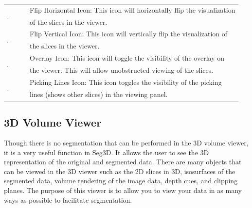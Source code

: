 \documentclass[fleqn,11pt,openany]{book}
\begin{document}
\begin{table}[h!]
\begin{tabular}{|l|l|}
& \\
\hline
\multirow{2}{*}{ \includegraphics[width=0.05\textwidth]{Seg3DBasicFunctionality_figures/FlipHorizOff.png} }
& Flip Horizontal Icon: This icon will horizontally flip the visualization \\
& of the slices in the viewer.\\
\hline
\multirow{2}{*}{ \includegraphics[width=0.05\textwidth]{Seg3DBasicFunctionality_figures/FlipVertOff.png} }
& Flip Vertical Icon: This icon will vertically flip the visualization of \\
& the slices in the viewer.\\
\hline
\multirow{2}{*}{ \includegraphics[width=0.05\textwidth]{Seg3DBasicFunctionality_figures/OverlayOff.png} }
&  Overlay Icon: This icon will toggle the visibility of the overlay on \\
& the viewer.  This will allow unobstructed viewing of the slices.\\
\hline
\multirow{2}{*}{ \includegraphics[width=0.05\textwidth]{Seg3DBasicFunctionality_figures/PickingLinesOff.png} }
& Picking Lines Icon: This icon toggles the visibility of the picking\\
& lines (shows other slices) in the viewing panel.\\
\hline
\end{tabular}
\end{table}

\subsection{3D Volume Viewer}

Though there is no segmentation that can be performed in the 3D volume viewer, it is a very useful function in Seg3D.
It allows the user to see the 3D representation of the original and segmented data.
There are many objects that can be viewed in the 3D viewer such as the 2D slices in 3D, isosurfaces of the segmented data, volume rendering of the image data,  depth cues, and clipping planes.
The purpose of this viewer is to allow you to view your data in as many ways as possible to facilitate segmentation.
\end{document}
